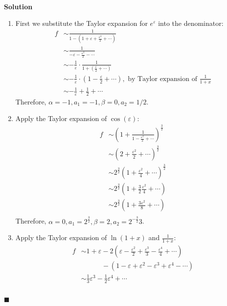\documentclass[11pt]{article}
\newcommand{\vep}{\varepsilon}
\theoremstyle{problemstyle}
\newenvironment{solution}
  {\noindent\textbf{Solution}\quad}
  {\hfill$\blacksquare$\par\vspace{1em}}
\begin{document}
\begin{solution}
  \begin{enumerate}
    \item First we substitute the Taylor expansion for $e^\vep$ into the denominator:
      \begin{align*}
        f & \sim \frac{1}{1 - \left(1 + \vep + \frac{\vep^2}{2} + \cdots \right)} \\
          & \sim \frac{1}{-\vep - \frac{\vep^2}{2} - \cdots} \\
          & \sim -\frac{1}{\vep} \cdot \frac{1}{1 + \left( \frac{\vep}{2} + \cdots \right)} \\
          & \sim -\frac{1}{\vep} \cdot \left(1 - \frac{\vep}{2} + \cdots \right), \text{ by Taylor
            expansion of } \frac{1}{1+x} \\
          & \sim -\frac{1}{\vep} + \frac{1}{2} + \cdots
      \end{align*}
      Therefore, $\alpha = -1, a_1 = -1, \beta = 0, a_2 = 1/2$.
    \item Apply the Taylor expansion of $\cos(\vep)$:
      \begin{align*}
        f & \sim \left(1 + \frac{1}{1 - \frac{\vep^2}{2} + \cdots}\right)^{\frac{3}{2}} \\
          & \sim \left(2 + \frac{\vep^2}{2} + \cdots\right)^{\frac{3}{2}} \\
          & \sim 2^{\frac{3}{2}} \left(1 + \frac{\vep^2}{4} + \cdots\right)^{\frac{3}{2}} \\
          & \sim 2^{\frac{3}{2}} \left(1 + \frac{3}{2}\frac{\vep^2}{4} + \cdots\right) \\
          & \sim 2^{\frac{3}{2}} \left(1 + \frac{3\vep^2}{8} + \cdots\right) \\
      \end{align*}
      Therefore, $\alpha = 0, a_1 = 2^{\frac{3}{2}}, \beta = 2, a_2 = 2^{-\frac{3}{2}}3$.
    \item Apply the Taylor expansion of $\ln(1+x)$ and $\frac{1}{1+x}$:
      \begin{align*}
        f &\sim 1 + \vep - 2\left(\vep - \frac{\vep^2}{2} + \frac{\vep^3}{3} - \frac{\vep^4}{4} +
            \cdots \right) \\
          & \quad \quad \quad - \left(1 - \vep + \vep^2 - \vep^3 + \vep^4 - \cdots \right) \\
          & \sim \frac{1}{3}\vep^3 - \frac{1}{2}\vep^4 + \cdots \\ 
      \end{align*}

\end{enumerate}
\end{solution}
\end{document}

